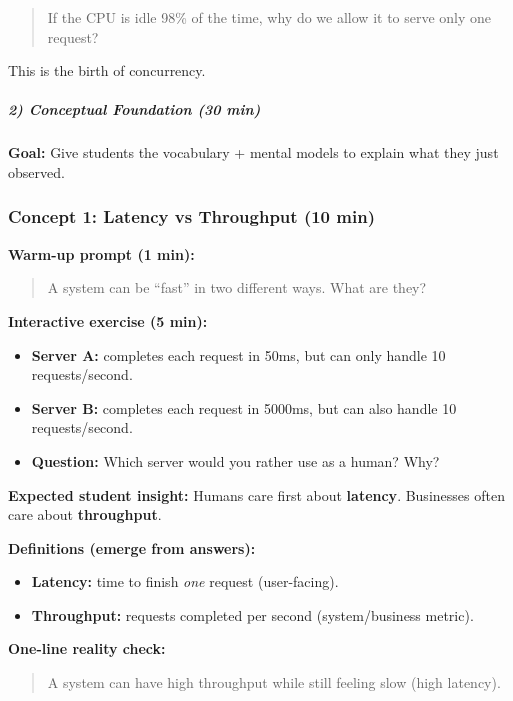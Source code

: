 \documentclass[11pt,a4paper]{article}
\begin{document}
\begin{quote}
	If the CPU is idle 98\% of the time,
	why do we allow it to serve only one request?
\end{quote}

This is the birth of concurrency.


\subparagraph{2) Conceptual Foundation (30 min)}
\textbf{Goal:} Give students the vocabulary + mental models to explain what they just observed.

\subsubsection*{Concept 1: Latency vs Throughput (10 min)}

\textbf{Warm-up prompt (1 min):}
\begin{quote}
	A system can be ``fast'' in two different ways. What are they?
\end{quote}

\textbf{Interactive exercise (5 min):}
\begin{itemize}[leftmargin=*]
	\item \textbf{Server A:} completes each request in 50ms, but can only handle 10 requests/second.
	\item \textbf{Server B:} completes each request in 5000ms, but can also handle 10 requests/second.
	\item \textbf{Question:} Which server would you rather use as a human? Why?
\end{itemize}

\textbf{Expected student insight:}
Humans care first about \textbf{latency}. Businesses often care about \textbf{throughput}.

\textbf{Definitions (emerge from answers):}
\begin{itemize}[leftmargin=*]
	\item \textbf{Latency:} time to finish \textit{one} request (user-facing).
	\item \textbf{Throughput:} requests completed per second (system/business metric).
\end{itemize}

\textbf{One-line reality check:}
\begin{quote}
	A system can have high throughput while still feeling slow (high latency).
\end{quote}
\end{document}
